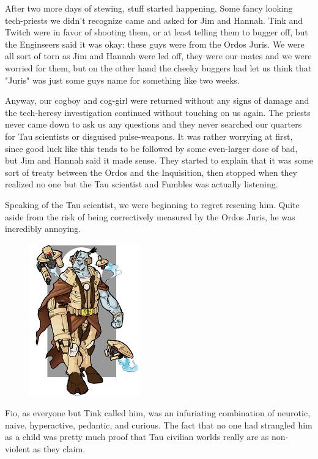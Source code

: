 After two more days of stewing, stuff started happening. 
Some fancy looking tech-priests we didn't recognize came and asked for Jim and Hannah. 
Tink and Twitch were in favor of shooting them, or at least telling them to bugger off, but the Enginseers said it was okay: 
these guys were from the Ordos Juris. 
We were all sort of torn as Jim and Hannah were led off, they were our mates and we were worried for them, but on the other hand the cheeky buggers had let us think that "Juris" was just some guys name for something like two weeks.

Anyway, our cogboy and cog-girl were returned without any signs of damage and the tech-heresy investigation continued without touching on us again. 
The priests never came down to ask us any questions and they never searched our quarters for Tau scientists or disguised pulse-weapons. 
It was rather worrying at first, since good luck like this tends to be followed by some even-larger dose of bad, but Jim and Hannah said it made sense. 
They started to explain that it was some sort of treaty between the Ordos and the Inquisition, then stopped when they realized no one but the Tau scientist and Fumbles was actually listening.

Speaking of the Tau scientist, we were beginning to regret rescuing him. 
Quite aside from the risk of being correctively measured by the Ordos Juris, he was incredibly annoying.

\begin{figure}
	\begin{center}
		\includegraphics[width=\figwidth]{pics/11/98.png}
	\end{center}
\end{figure}
Fio, as everyone but Tink called him, was an infuriating combination of neurotic, naive, hyperactive, pedantic, and curious. 
The fact that no one had strangled him as a child was pretty much proof that Tau civilian worlds really are as non-violent as they claim.


